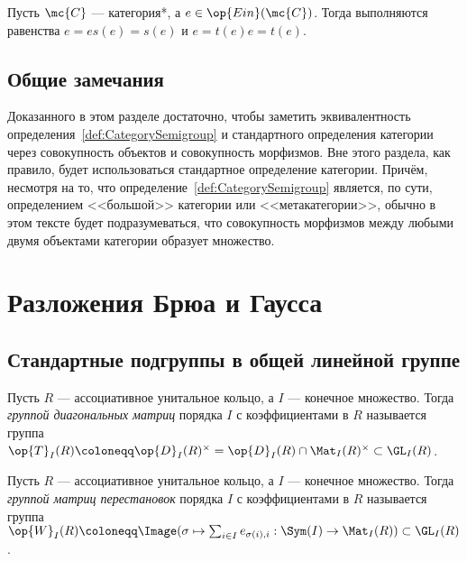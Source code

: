 \documentclass[
	extrafontsizes,
	11pt,
	hyphens,
]{memoir}
\begin{document}
\begin{observation}
Пусть \(\mc{C}\) --- категория*, а \(e \in \op{Ein}(\mc{C})\). Тогда выполняются равенства \(e = e s(e) = s(e)\) и \(e = t(e) e = t(e)\).
\end{observation}

\subsection{Общие замечания}

Доказанного в этом разделе достаточно, чтобы заметить эквивалентность определения~\ref{def:CategorySemigroup} и стандартного определения категории через совокупность объектов и совокупность морфизмов.
Вне этого раздела, как правило, будет использоваться стандартное определение категории.
Причём, несмотря на то, что определение~\ref{def:CategorySemigroup} является, по сути, определением <<большой>> категории или <<метакатегории>>, обычно в этом тексте будет подразумеваться, что совокупность морфизмов между любыми двумя объектами категории образует множество.


\section{Разложения Брюа и Гаусса}

\subsection{Стандартные подгруппы в общей линейной группе}

\begin{definition}
Пусть \(R\) --- ассоциативное унитальное кольцо, а \(I\) --- конечное множество.
Тогда \emph{группой диагональных матриц} порядка \(I\) с коэффициентами в \(R\) называется группа \(\op{T}_I(R) \coloneqq \op{D}_I(R)^{\times} = \op{D}_I(R) \cap \Mat_I(R)^{\times} \subset \GL_I(R)\).
\end{definition}

\begin{definition}
Пусть \(R\) --- ассоциативное унитальное кольцо, а \(I\) --- конечное множество.
Тогда \emph{группой матриц перестановок}  порядка \(I\) с коэффициентами в \(R\)
называется группа
\(\op{W}_I(R) \coloneqq \Image(\sigma \mapsto \sum_{i \in I} e_{\sigma(i), i} : \Sym(I) \to \Mat_I(R)) \subset \GL_I(R)\).
\end{definition}
\end{document}
